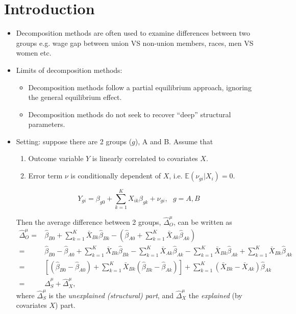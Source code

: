 \documentclass[a4paper, 12pt]{article}
\newcommand{\E}{\mathbb{E}}
\begin{document}
\section{Introduction}
\begin{itemize}
\item Decomposition methods are often used to examine differences between two groups e.g. wage gap between union VS non-union members, races, men VS women etc.
\item Limits of decomposition methods:
\begin{itemize}
\item Decomposition methods follow a partial equilibrium approach, ignoring the general equilibrium effect.
\item Decomposition methods do not seek to recover ``deep'' structural parameters.
\end{itemize}
\item Setting: suppose there are 2 groups ($g$), A and B. Assume that 
\begin{enumerate}
\item Outcome variable $Y$ is linearly correlated to covariates $X$.
\item Error term $\nu$ is conditionally dependent of $X$, i.e. $\E(\nu_{gi}|X_i)=0$.
\end{enumerate}
\begin{equation}
Y_{gi}= \beta_{g0} + \sum_{k=1}^K X_{ik} \beta_{gk} + \nu_{gi}, \text{ } g=A,B
\end{equation}
\par Then the average difference between 2 groups, $\hat{\Delta}_O^\mu$, can be written as
\begin{align*}
\hat{\Delta}_O^\mu 
=& 
\hat{\beta}_{B0} + \sum_{k=1}^K \bar{X}_{Bk}\hat{\beta}_{Bk}
- 
(
\hat{\beta}_{A0} + \sum_{k=1}^K \bar{X}_{Ak} \hat{\beta}_{Ak}
) \\
=&
\hat{\beta}_{B0} -\hat{\beta}_{A0}
+ 
\sum_{k=1}^K \bar{X}_{Bk}\hat{\beta}_{Bk}
- 
\sum_{k=1}^K \bar{X}_{Ak} \hat{\beta}_{Ak}
-
\sum_{k=1}^K \bar{X}_{Bk}\hat{\beta}_{Ak}
+
\sum_{k=1}^K \bar{X}_{Bk}\hat{\beta}_{Ak} \\
=&
\left[
(
\hat{\beta}_{B0} -\hat{\beta}_{A0}
)
+ 
\sum_{k=1}^K \bar{X}_{Bk}
(
\hat{\beta}_{Bk}
-
\hat{\beta}_{Ak}
)
\right]
+
\sum_{k=1}^K (
\bar{X}_{Bk}
- 
\bar{X}_{Ak} 
)
\hat{\beta}_{Ak} \\
=& 
\hat{\Delta}_S^\mu + \hat{\Delta}_X^\mu,
\end{align*}
where $\hat{\Delta}_S^\mu$ is the \emph{unexplained (structural) part}, and $\hat{\Delta}_X^\mu$ the \emph{explained} (by covariates $X$) part.

\end{itemize}
\end{document}
